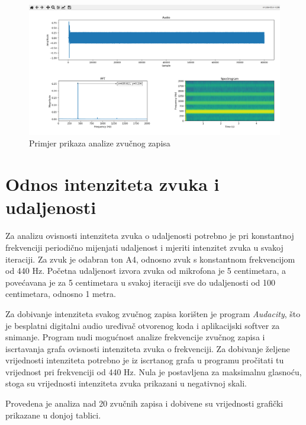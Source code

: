 \begin{figure}[ht]
	\includegraphics[width=\linewidth]{imgs/analyse_example}
	\caption{Primjer prikaza analize zvučnog zapisa}
	\label{fig:analyse_example}
\end{figure}

\section{Odnos intenziteta zvuka i udaljenosti}

Za analizu ovisnosti intenziteta zvuka o udaljenosti potrebno je pri konstantnoj frekvenciji periodično mijenjati udaljenost i mjeriti intenzitet zvuka u svakoj iteraciji. Za zvuk je odabran ton A4, odnosno zvuk s konstantnom frekvencijom od 440 Hz. Početna udaljenost izvora zvuka od mikrofona je 5 centimetara, a povećavana je za 5 centimetara u svakoj iteraciji sve do udaljenosti od 100 centimetara, odnosno 1 metra. 

Za dobivanje intenziteta svakog zvučnog zapisa korišten je program \textit{Audacity}, što je besplatni digitalni audio uređivač otvorenog koda i aplikacijski softver za snimanje. Program nudi mogućnost analize frekvencije zvučnog zapisa i iscrtavanja grafa ovisnosti intenziteta zvuka o frekvenciji. Za dobivanje željene vrijednosti intenziteta potrebno je iz iscrtanog grafa u programu pročitati tu vrijednost pri frekvenciji od 440 Hz. Nula je postavljena za maksimalnu glasnoću, stoga su vrijednosti intenziteta zvuka prikazani u negativnoj skali. 

Provedena je analiza nad 20 zvučnih zapisa i dobivene su vrijednosti grafički prikazane u donjoj tablici. 


